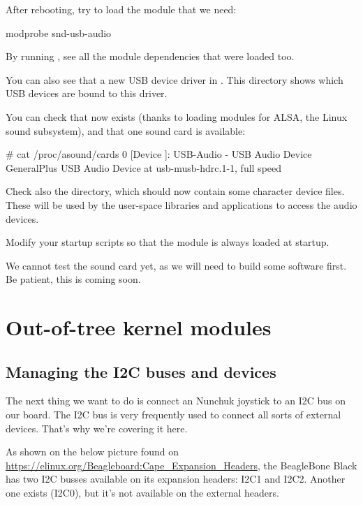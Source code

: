 {After rebooting, try to load the module that we need:

\begin{bashinput}
modprobe snd-usb-audio
\end{bashinput}

By running , see all the module dependencies that
were loaded too.

You can also see that a new USB device driver in
. This directory shows which
USB devices are bound to this driver.

You can check that  now exists (thanks to loading
modules for ALSA, the Linux sound subsystem), and that one sound
card is available:

\begin{bashinput}
# cat /proc/asound/cards
 0 [Device         ]: USB-Audio - USB Audio Device
                      GeneralPlus USB Audio Device at usb-musb-hdrc.1-1, full speed
\end{bashinput}

Check also the  directory, which should now contain
some character device files. These will be used by the user-space
libraries and applications to access the audio devices.

Modify your startup scripts so that the  module
is always loaded at startup.

We cannot test the sound card yet, as we will need to build some
software first. Be patient, this is coming soon.

\section{Out-of-tree kernel modules}
\subsection{Managing the I2C buses and devices}

The next thing we want to do is connect an Nunchuk joystick
to an I2C bus on our board. The I2C bus is very frequently used
to connect all sorts of external devices. That's why we're covering
it here.

As shown on the below picture found on
\url{https://elinux.org/Beagleboard:Cape_Expansion_Headers}, the
BeagleBone Black has two I2C busses available on its expansion headers:
I2C1 and I2C2. Another one exists (I2C0), but it's not
available on the external headers.

}

